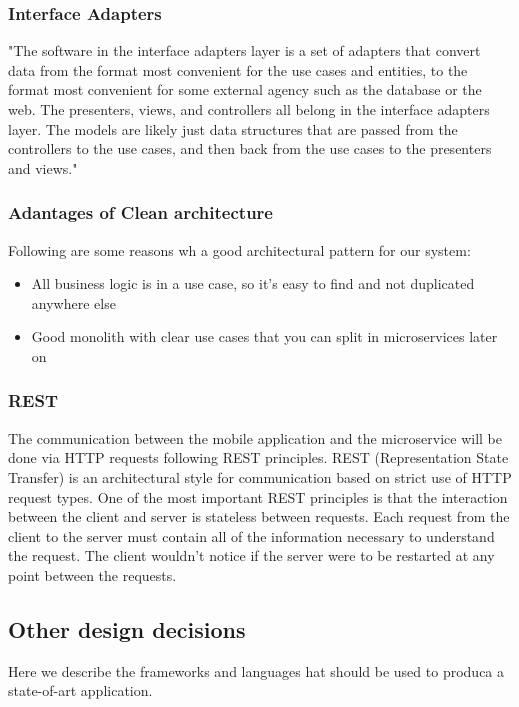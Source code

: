 \subsubsection{Interface Adapters}
"The software in the interface adapters layer is a set of adapters that convert data from the format most convenient for the use cases and entities, to the format most convenient for some external agency such as the database or
the web. The presenters, views, and controllers all belong in the interface adapters layer. The models are likely just data structures that are passed from the controllers to the use cases, and then back from the use cases to the presenters and views." \cite{clean}

\subsubsection{Adantages of Clean architecture}
Following are some reasons wh a good architectural pattern for our system:
\begin{itemize}
  \item All business logic is in a use case, so it’s easy to find and not duplicated anywhere else
  \item Good monolith with clear use cases that you can split in microservices later on

\end{itemize}


\subsubsection{REST}
The communication between the mobile application and the microservice will be done via HTTP requests following REST principles. REST (Representation State Transfer) is an architectural style for communication based on strict use of HTTP request types. One of the most important REST principles is that the interaction between the client and server is stateless between requests. Each request from the client to the server must contain all of the information necessary to understand the request. The client wouldn’t notice if the server were to be restarted at any point between the requests.


\subsection{Other design decisions}
Here we describe the frameworks and languages hat should be used to produca a state-of-art application.

